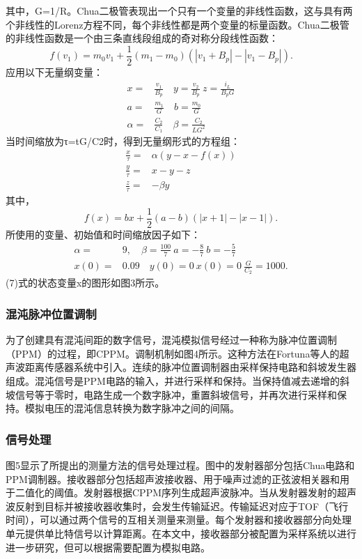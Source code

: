 其中，G=1/R。Chua二极管表现出一个只有一个变量的非线性函数，这与具有两个非线性的Lorenz方程不同，每个非线性都是两个变量的标量函数。Chua二极管的非线性函数是一个由三条直线段组成的奇对称分段线性函数：
\begin{equation*}
	f(v_{1})=m_{0}v_{1}+\frac {1}{2}(m_{1}-m_{0})(|v_{1}+B_{p}|-|v_{1}-B_{p}|).\qquad \tag{5}
\end{equation*}
应用以下无量纲变量：
\begin{align*}
	x=&\frac {v_{1}}{B_{p}} \quad y=\frac {v_{2}}{B_{p}} ~ z=\frac {i_{L}}{B_{p}G} \\
	a=&\frac {m_{1}}{G} \quad b=\frac {m_{0}}{G} \\
	\alpha=&\frac {C_{2}}{C_{1}} \quad \beta =\frac {C_{2}}{LG^{2}}\tag{6}
\end{align*}
当时间缩放为τ=tG/C2时，得到无量纲形式的方程组：
\begin{align*}
	\frac {x}{\tau }=&\alpha (y-x-f(x)) \\
	\frac {y}{\tau }=&x-y-z \\
	\frac {z}{\tau }=&-\beta y \tag{7}
\end{align*}
其中，
\begin{equation*}
	f(x)=bx+\frac {1}{2}(a-b)(|x+1|-|x-1|). \tag{8}
\end{equation*}
所使用的变量、初始值和时间缩放因子如下：
\begin{align*}
	\alpha=&9, \quad \beta =\frac {100}{7} ~a=-\frac {8}{7}~b=-\frac {5}{7}\\
	x(0)=&0.09 \quad y(0)=0 ~x(0)=0 ~\frac {G}{C_{2}}=1000.
\end{align*}
(7)式的状态变量x的图形如图3所示。

\subsubsection{混沌脉冲位置调制}
为了创建具有混沌间距的数字信号，混沌模拟信号经过一种称为脉冲位置调制（PPM）的过程，即CPPM。调制机制如图4所示。这种方法在Fortuna等人的超声波距离传感器系统中引入。连续的脉冲位置调制器由采样保持电路和斜坡发生器组成。混沌信号是PPM电路的输入，并进行采样和保持。当保持值减去递增的斜坡信号等于零时，电路生成一个数字脉冲，重置斜坡信号，并再次进行采样和保持。模拟电压的混沌信息转换为数字脉冲之间的间隔。

\subsubsection{信号处理}
图5显示了所提出的测量方法的信号处理过程。图中的发射器部分包括Chua电路和PPM调制器。接收器部分包括超声波接收器、用于噪声过滤的正弦波相关器和用于二值化的阈值。发射器根据CPPM序列生成超声波脉冲。当从发射器发射的超声波反射到目标并被接收器收集时，会发生传输延迟。传输延迟对应于TOF（飞行时间），可以通过两个信号的互相关测量来测量。每个发射器和接收器部分向处理单元提供单比特信号以计算距离。在本文中，接收器部分被配置为采样系统以进行进一步研究，但可以根据需要配置为模拟电路。

